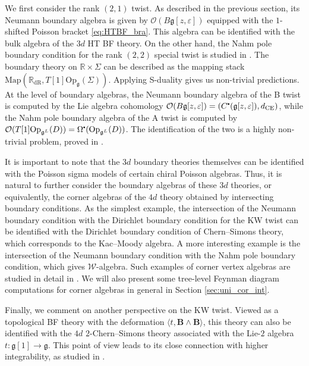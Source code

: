 \documentclass[11pt]{article}
\newcommand{\R}{\mathbb{R}}
\newcommand\sbullet[1][.5]{\mathbin{\vcenter{\hbox{\scalebox{#1}{$\bullet$}}}}}
\numberwithin{equation}{section}
\begin{document}
We first consider the rank $(2,1)$ twist. As described in the previous section, its Neumann boundary algebra is given by $\mathcal{O}(B\mathfrak{g}[z,\varepsilon])$ equipped with the $1$-shifted Poisson bracket \eqref{eq:HTBF_bra}. This algebra can be identified with the bulk algebra of the $3d$ HT BF theory. On the other hand, the Nahm pole boundary condition for the rank $(2,2)$ special twist is studied in \cite{butson2016degenerate}. The boundary theory on $\R\times \Sigma$ can be described as the mapping stack $\mathrm{Map}(\R_{\mathrm{dR}}, T[1]\mathrm{Op}_{\mathfrak{g}}(\Sigma))$. Applying S-duality gives us non-trivial predictions. At the level of boundary algebras, the Neumann boundary algebra of the B twist is computed by the Lie algebra cohomology $\mathcal{O}(B\mathfrak{g}[z,\varepsilon]) = (C^{\sbullet}(\mathfrak{g}[z,\varepsilon]),d_{\mathrm{CE}})$, while the Nahm pole boundary algebra of the A twist is computed by $\mathcal{O}(T[1]\mathrm{Op}_{\mathfrak{g}^{L}}(D)) = \Omega^{\sbullet}(\mathrm{Op}_{\mathfrak{g}^{L}}(D))$. The identification of the two is a highly non-trivial problem, proved in \cite{fishel2008strong}.

It is important to note that the $3d$ boundary theories themselves can be identified with the Poisson sigma models of certain chiral Poisson algebras. Thus, it is natural to further consider the boundary algebras of these $3d$ theories, or equivalently, the corner algebras of the $4d$ theory obtained by intersecting boundary conditions. As the simplest example, the intersection of the Neumann boundary condition with the Dirichlet boundary condition for the KW twist can be identified with the Dirichlet boundary condition of Chern--Simons theory, which corresponds to the Kac--Moody algebra. A more interesting example is the intersection of the Neumann boundary condition with the Nahm pole boundary condition, which gives $\mathcal{W}$-algebra. Such examples of corner vertex algebras are studied in detail in \cite{Gaiotto:2017euk}. We will also present some tree-level Feynman diagram computations for corner algebras in general in Section \ref{sec:uni_cor_int}.


Finally, we comment on another perspective on the KW twist. Viewed as a topological BF theory with the deformation $\langle t, \boldsymbol{B}\wedge \boldsymbol{B}\rangle$, this theory can also be identified with the $4d$ $2$-Chern--Simons theory \cite{Soncini:2014ara,Zucchini:2015ohw} associated with the Lie-$2$ algebra $t: \mathfrak{g}[1] \to \mathfrak{g}$. This point of view leads to its close connection with higher integrability, as studied in \cite{Chen:2025qpt,Chen:2024axr}.
\end{document}
